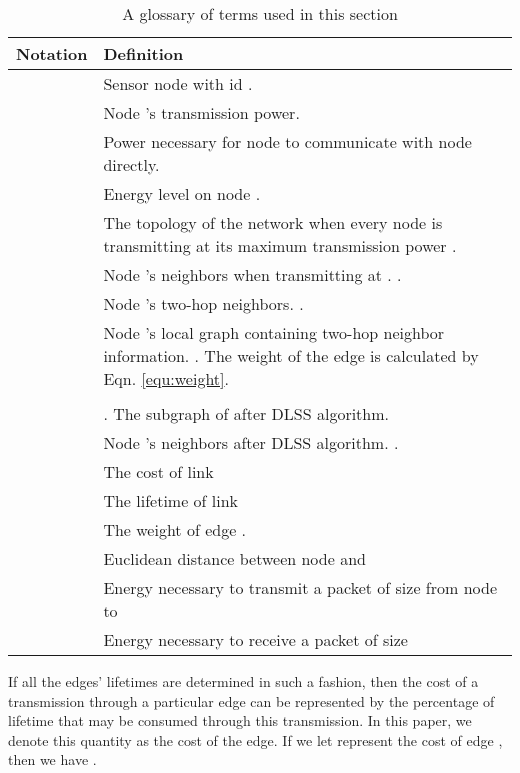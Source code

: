 \documentclass[journal,12pt,onecolumn]{IEEEtran}
\begin{document}
\begin{table}[!t]
\begin{center}
\begin{tabular}{cp{6cm}}
\hline
Notation & Definition \\
\hline
    &Sensor node with id .\\
\hline
    &Node 's transmission power.\\
\hline
    &Power necessary for node  to communicate with node  directly.\\
\hline
    &Energy level on node .\\
\hline
    &The topology of the network when every node is transmitting at its maximum transmission power . \\
\hline
    &Node 's neighbors when transmitting at . .\\
\hline
    &Node 's two-hop neighbors. .\\
\hline
    & Node 's local graph containing two-hop neighbor information. . The weight of the edge is calculated by Eqn.\,\,\ref{equ:weight}.\\
\hline
    &\\
\hline
        & . The subgraph of  after DLSS algorithm.\\
\hline
    &Node 's neighbors after DLSS algorithm. .\\
\hline
        &The cost of link \\
\hline
        &The lifetime of link \\
\hline
        &The weight of edge . \\
\hline
        &Euclidean distance between node  and \\
\hline
        &Energy necessary to transmit a packet of size  from node  to \\
\hline
        &Energy necessary to receive a packet of size \\
\hline
\end{tabular}
\vspace{8pt}
\caption{A glossary of terms used in this section} \label{table:term}
\vspace{-25pt}
\end{center}
\end{table}
 
If all the edges' lifetimes are determined in such a fashion, then
the cost of a transmission through a particular edge can be
represented by the percentage of lifetime that may be consumed
through this transmission. In this paper, we denote this quantity as
the cost of the edge. If we let  represent the cost of edge
, then we have .
\end{document}
